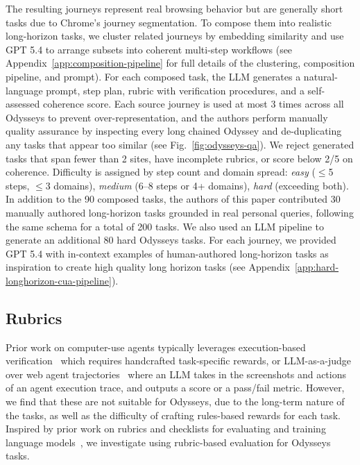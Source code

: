 \documentclass{article}
\theoremstyle{plain}
\theoremstyle{definition}
\theoremstyle{remark}
\def\odysseys{Odysseys\xspace}
\begin{document}
The resulting journeys represent real browsing behavior but are generally short tasks due to Chrome's journey segmentation. To compose them into realistic long-horizon tasks, we cluster related journeys by embedding similarity and use GPT 5.4 to arrange subsets into coherent multi-step workflows (see Appendix~\ref{app:composition-pipeline} for full details of the clustering, composition pipeline, and prompt). For each composed task, the LLM generates a natural-language prompt, step plan, rubric with verification procedures, and a self-assessed coherence score. Each source journey is used at most 3 times across all \odysseys to prevent over-representation, and the authors perform manually quality assurance by inspecting every long chained Odyssey and de-duplicating any tasks that appear too similar (see Fig.~\ref{fig:odysseys-qa}).
We reject generated tasks that span fewer than 2 sites, have incomplete rubrics, or score below 2/5 on coherence. Difficulty is assigned by step count and domain spread: \textit{easy} ($\leq$5 steps, $\leq$3 domains), \textit{medium} (6--8 steps or 4+ domains), \textit{hard} (exceeding both).
In addition to the 90 composed tasks, the authors of this paper contributed 30 manually authored long-horizon tasks grounded in real personal queries, following the same schema for a total of 200 tasks. We also used an LLM pipeline to generate an additional 80 hard Odysseys tasks. For each journey, we provided GPT 5.4 with in-context examples of human-authored long-horizon tasks as inspiration to create high quality long horizon tasks (see Appendix~\ref{app:hard-longhorizon-cua-pipeline}).

\subsection{Rubrics}
\label{sec:rubrics}

Prior work on computer-use agents typically leverages execution-based verification~\citep{zhou2023webarena,koh2024visualwebarena,xie2024osworld} which requires handcrafted task-specific rewards, or LLM-as-a-judge over web agent trajectories~\citep{he2024webvoyager,xue2025illusion} where an LLM takes in the screenshots and actions of an agent execution trace, and outputs a score or a pass/fail metric. However, we find that these are not suitable for \odysseys, due to the long-term nature of the tasks, as well as the difficulty of crafting rules-based rewards for each task.
Inspired by prior work on rubrics and checklists for evaluating and training language models~\citep{shao2025dr,hashemi2024llm,gunjal2025rubrics,viswanathan2025checklists}, we investigate using rubric-based evaluation for \odysseys tasks.
\end{document}
